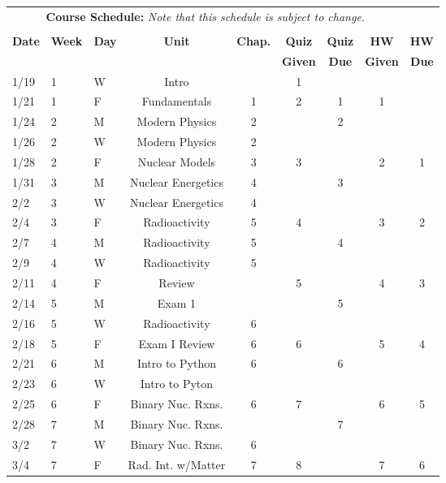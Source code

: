 \documentclass[11pt, a4paper]{article}
\begin{document}
\pagebreak
\FloatBarrier
\renewcommand{\arraystretch}{1}
\begin{table}[h]
\begin{center}
\begin{tabular}{lllcccccc}
\multicolumn{8}{c}{\textbf{Course Schedule:}\textit{ Note that this schedule is
subject to change.}}\\
&&&&&&&&\\
\textbf{Date} & \textbf{Week} & \textbf{Day} & \textbf{Unit} & \textbf{Chap.} & \textbf{Quiz}& \textbf{Quiz} & \textbf{HW} & \textbf{HW}\\
              &  &  &  &  & \textbf{Given} & \textbf{Due} & \textbf{Given} & \textbf{Due}\\ \hline
\hline
1/19 & 1 & W & Intro              &  & 1 &  &  & \\
1/21 & 1 & F & Fundamentals       & 1 & 2 & 1 & 1 &  \\
1/24 & 2 & M & Modern Physics     & 2 &   & 2 & &  \\
1/26 & 2 & W & Modern Physics     & 2 &   &  &  &  \\
1/28 & 2 & F & Nuclear Models     & 3 & 3 &  & 2 & 1  \\
1/31 & 3 & M & Nuclear Energetics & 4 &   & 3 & &  \\
2/2 & 3 & W & Nuclear Energetics  & 4 &   &  &  &  \\
2/4 & 3 & F & Radioactivity       & 5 & 4 &  & 3 & 2 \\
2/7 & 4 & M & Radioactivity       & 5 &   & 4 &  &  \\
2/9 & 4 & W & Radioactivity       & 5 &   &  &  &  \\
2/11 & 4 & F & Review             &   & 5 &  & 4 & 3 \\
2/14 & 5 & M & Exam 1             &   &   & 5  &  &  \\
2/16 & 5 & W & Radioactivity  & 6 &   &  &  &  \\
2/18 & 5 & F & Exam I Review  & 6 & 6 &  & 5 & 4 \\
2/21 & 6 & M & Intro to Python  & 6 &   & 6 &  &  \\
2/23 & 6 & W & Intro to Pyton      &  &  &  &  &  \\
2/25 & 6 & F & Binary Nuc. Rxns.  & 6 & 7 &  & 6 & 5  \\
2/28 & 7 & M & Binary Nuc. Rxns. &  &  & 7 &  &  \\
3/2 & 7 & W & Binary Nuc. Rxns.  & 6 &  &  &  &  \\
3/4 & 7 & F & Rad. Int. w/Matter  & 7 & 8 &  & 7 & 6 \\

\end{tabular}
\end{center}
\end{table}
\end{document}
